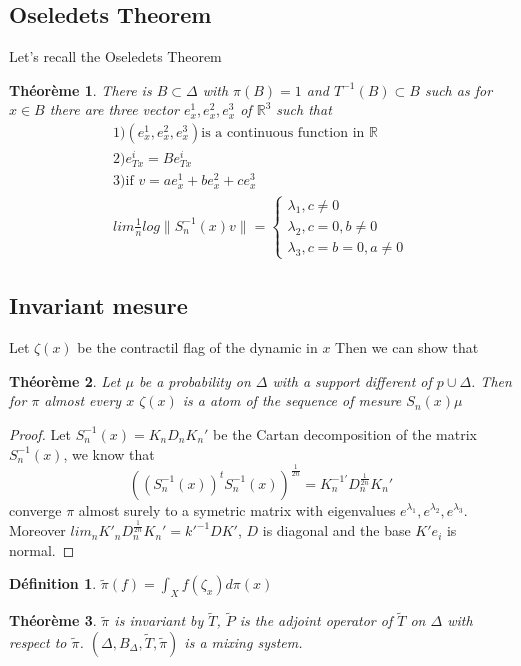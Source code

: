\documentclass[12pt]{article}
\theoremstyle{plain}%
\newtheorem{thm}{Théorème}[section]
\theoremstyle{definition}
\newtheorem{dfnt}{Définition}[section]
\theoremstyle{remark}
\begin{document}
\subsection{Oseledets Theorem}
Let's recall the Oseledets Theorem
\begin{thm}
There is $B \subset \Delta$ with $\pi(B)=1$ and $T^{-1}(B) \subset B$ such as for  $x\in B$ there are three vector $e^1_x,e^2_x,e^3_x$ of $\mathbb{R}^3$ such that \[
\begin{matrix}
1)(e^1_x,e^2_x,e^3_x)\text{is a continuous function in } \mathbb{R} \\
2)e^i_{Tx}=Be^i_{Tx} \\
3)\text{if }v=ae^1_x+be^2_x+ce^3_x\\
lim \frac{1}{n}log \|S_n^{-1}(x)v\|=
\left \{ \begin{matrix}
\lambda_1,c \ne 0\\
\lambda_2,c=0,b \ne 0 \\
\lambda_3,c=b=0,a\ne 0
\end{matrix}
\right .
\end{matrix}
\]
\end{thm}
\subsection{Invariant mesure}
Let $\zeta(x)$ be the contractil flag of the dynamic in $x$\newline
Then we can show that
\begin{thm}
Let $\mu$ be a probability on $\Delta$ with a support different of $p \cup \Delta$. Then for $\pi$ almost every $x$ $\zeta(x)$ is a atom of the sequence of mesure $S_n(x)\mu$
\end{thm}
\begin{proof}
Let $S_n^{-1}(x)=K_n D_n K_n'$ be the Cartan decomposition of the matrix $S_n^{-1}(x)$, we know that \[
((S_n^{-1}(x))^{t}
 S_n^{-1}(x))^{\frac{1}{2n}} =
 K_n^{-1'}
 D_n^{\frac{1}{2n}}
 K_n'
\]
converge $\pi$ almost surely to a symetric matrix with eigenvalues $e^{\lambda_1},e^{\lambda_2},e^{\lambda_3}$. Moreover $lim_n K'_n D_n^{\frac{1}{2n}} K_n'=k'^{-1}D K'$, $D$ is diagonal and the base $K' e_i$ is normal.
\end{proof}
\begin{dfnt}
$\tilde{\pi}(f)=\int_X f(\zeta_x) d \pi(x)$
\end{dfnt}

\begin{thm} %
$\tilde{\pi}$ is invariant by $\tilde{T}$, $\tilde{P}$ is the adjoint operator of $\tilde{T}$ on $\Delta$ with respect to $\tilde{\pi}$. $(\Delta,B_\Delta,\tilde{T},\tilde{\pi})$ is a mixing system.
\end{thm}
\end{document}
